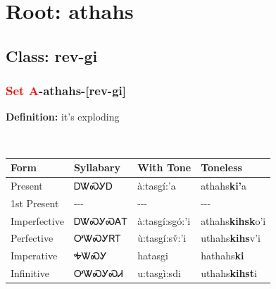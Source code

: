 \needspace{4in}
\section*{Root: athahs}
\nopagebreak
{}
\needspace{3in}
\subsection*{Class: rev-gi}
\nopagebreak
\needspace{2in}
\subsubsection*{\textcolor{Red}{Set A}{-}\textbf{athahs}{-}[rev-gi]}
\nopagebreak
\textbf{Definition: } it{\textquoteright}s exploding
\\[0.5em]
\begin{tabularx}{\textwidth}{l X X X}%
\toprule%
\textbf{Form}&\textbf{Syllabary}&\textbf{With Tone}&\textbf{Toneless}\\%
\midrule%
Present&ᎠᏔᏍᎩᎠ&à:tasgí:’a&athahs\textbf{ki'}a\\%
1st Present&{-}{-}{-}&{-}{-}{-}&{-}{-}{-}\\%
Imperfective&ᎠᏔᏍᎩᏍᎪᎢ&à:tasgí:sgó:’i&athahs\textbf{kihsk}o'i\\%
Perfective&ᎤᏔᏍᎩᏒᎢ&ù:tasgí:sv̌:’i&uthahs\textbf{kihs}v'i\\%
Imperative&ᎭᏔᏍᎩ&hatasgi&hathahs\textbf{ki}\\%
Infinitive&ᎤᏔᏍᎩᏍᏗ&u:tasgì:sdi&uthahs\textbf{kihst}i\\%
\bottomrule%
\end{tabularx}
\\[1em]